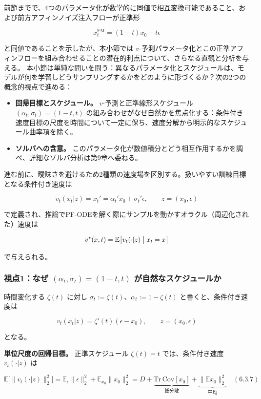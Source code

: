 前節までで、4つのパラメータ化が数学的に同値で相互変換可能であること、および前方アフィンノイズ注入フローが正準形

\[
x_t^{\mathrm{FM}}=(1-t)x_0+t\epsilon
\]


と同値であることを示したが、本小節では $v$-予測パラメータ化とこの正準アフィンフローを組み合わせることの潜在的利点について、さらなる直観と分析を与える。
本小節は単純な問いを問う：異なるパラメータ化とスケジュールは、モデルが何を学習しどうサンプリングするかをどのように形づくるか？次の2つの概念的視点で進める：

\begin{itemize}
\item \textbf{回帰目標とスケジュール。} $v$-予測と正準線形スケジュール $(\alpha_t,\sigma_t)=(1-t,t)$ の組み合わせがなぜ自然かを焦点化する：条件付き速度目標の尺度を時間について一定に保ち、速度分解から明示的なスケジュール曲率項を除く。
\item \textbf{ソルバへの含意。} このパラメータ化が数値積分とどう相互作用するかを調べ、詳細なソルバ分析は第9章へ委ねる。
\end{itemize}


進む前に、曖昧さを避けるため2種類の速度場を区別する。扱いやすい訓練目標となる条件付き速度は

\[
v_t(x_t|z)=x_t'=\alpha_t'x_0+\sigma_t'\epsilon,\qquad z=(x_0,\epsilon)
\]


で定義され、推論でPF-ODEを解く際にサンプルを動かすオラクル（周辺化された）速度は

\[
v^*(x,t)=\mathbb{E}\bigl[v_t(\cdot|z)\bigm|x_t=x\bigr]
\]


で与えられる。

\subsubsection*{視点1：なぜ $(\alpha_t,\sigma_t)=(1-t,t)$ が自然なスケジュールか}


時間変化する $\zeta(t)$ に対し $\sigma_t:=\zeta(t)$、$\alpha_t:=1-\zeta(t)$ と書くと、条件付き速度は

\[
v_t(x_t|z)=\zeta'(t)(\epsilon-x_0),\qquad z=(x_0,\epsilon)
\]


となる。

\textbf{単位尺度の回帰目標。} 正準スケジュール $\zeta(t)=t$ では、条件付き速度 $v_t(\cdot|z)$ は

\[
\mathbb{E}\bigl[\|v_t(\cdot|z)\|_2^2\bigr]=\mathbb{E}_\epsilon\|\epsilon\|_2^2+\mathbb{E}_{x_0}\|x_0\|_2^2=D+\underbrace{\mathrm{Tr}\,\mathrm{Cov}[x_0]}_{\text{総分散}}+\underbrace{\|\mathbb{E}x_0\|_2^2}_{\text{平均}} \quad (6.3.7)
\]


